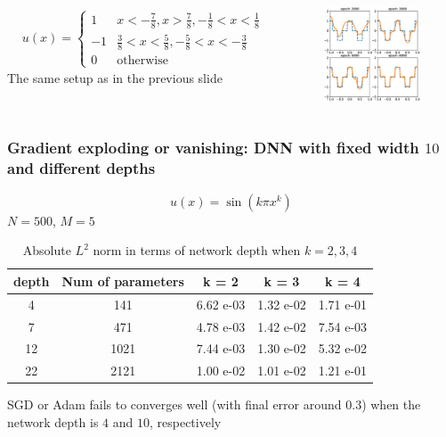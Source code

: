 \documentclass[aspectratio=169]{beamer}
\begin{document}
\begin{frame}
\begin{columns}
	\begin{align*}
	&u(x) = \left\{\begin{matrix}
	1   & x < -\frac{7}{8}, x> \frac{7}{8}, -\frac{1}{8}<x<\frac{1}{8}\\
	-1  & \frac{3}{8}< x< \frac{5}{8} , -\frac{5}{8}< x<- \frac{3}{8}\\
	0 & \text{otherwise} 
	\end{matrix} \right.
	\end{align*}
	The same setup as in the previous slide
	\begin{figure}[ht]
		\centering
		\includegraphics[width=0.7\linewidth]{Figure//Fprinciple_exm2}
	\end{figure}		
\end{columns}
\end{frame}
\begin{frame}
\frametitle{Gradient exploding or vanishing: DNN with fixed width $10$ and different depths}

\begin{equation*}
	u(x) = \sin(k\pi x ^k)
\end{equation*} 
$N = 500$, $M = 5$
\begin{table}
	\centering
	\begin{tabular}{|c|c|c|c|c|}
	\hline
		 depth & Num of parameters & k = 2 &  k = 3 & k = 4  \\
		\hline
		4   & 141 & 6.62 e-03 & 1.32 e-02 & 1.71 e-01\\
		7   & 471 & 4.78 e-03 & 1.42 e-02 & 7.54 e-03\\
		12  & 1021 & 7.44 e-03 & 1.30 e-02 & 5.32 e-02\\
		22  & 2121 & 1.00 e-02 & 1.01 e-02 & 1.21 e-01\\
		\hline
	\end{tabular}
	\caption{Absolute $L^2$ norm in terms of network depth when $k=2, 3, 4$}
\end{table}	

SGD or Adam fails to converges well (with final error around $0.3$) when the network depth is $4$ and $10$, respectively

\end{frame}
\end{document}
